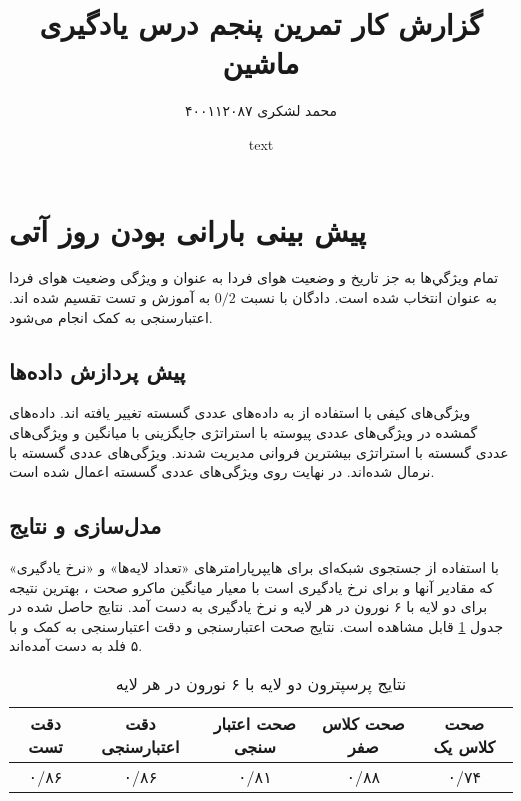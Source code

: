 \documentclass{article}
\title{گزارش کار تمرین پنجم درس یادگیری ماشین}
\author{محمد لشکری ۴۰۰۱۱۲۰۸۷}
\date{text}
\begin{document}
	\maketitle
	
	\section{پیش بینی بارانی بودن روز آتی}
	تمام ویژگي‌ها به جز تاریخ و وضعیت هوای فردا به عنوان 
	و ویژگی وضعیت هوای فردا به عنوان 
	انتخاب شده است. دادگان با نسبت $ 0/2 $ به آموزش و تست تقسیم شده اند. اعتبارسنجی به کمک 
	انجام می‌شود.
	\subsection{پیش پردازش داده‌ها}
	ویژگی‌های کیفی با استفاده از 
	به داده‌های عددی گسسته تغییر یافته اند. داده‌های گمشده در ویژگی‌های عددی پیوسته با استراتژی جایگزینی با میانگین و ویژگی‌های عددی گسسته با استراتژی بیشترین فروانی مدیریت شدند. ویژگی‌های عددی گسسته با 
	نرمال شده‌اند. در نهایت 
	روی ویژگی‌های عددی گسسته اعمال شده است.
	\subsection{مدل‌سازی و نتایج}
	با استفاده از جستجوی شبکه‌ای
	 برای هايپرپارامتر‌های «تعداد لایه‌ها» و «نرخ یادگیری» که مقادیر آنها 
	و برای نرخ یادگیری 
	 است با معیار میانگین ماکرو صحت
	،
	بهترین نتیجه برای دو لایه با ۶ نورون در هر لایه و نرخ یادگیری 
	به دست آمد. نتایج حاصل شده در جدول 
	\ref{perceptron}
	قابل مشاهده است. نتایج صحت اعتبارسنجی و دقت اعتبارسنجی به کمک 
	و با ۵ فلد به دست آمده‌اند.
	\begin{table}[h]
		\parbox{\linewidth}{
		\begin{center}
		\begin{tabular}{|c|c|c|c|c|}
			\hline
			دقت تست & دقت اعتبارسنجی & صحت اعتبار سنجی & صحت کلاس صفر & صحت کلاس یک \\
			\hline
			۰/۸۶& ۰/۸۶ & ۰/۸۱ & ۰/۸۸ & ۰/۷۴\\
			\hline
		\end{tabular}
		\caption{نتایج پرسپترون دو لایه با ۶ نورون در هر لایه}	
		\label{perceptron}
		\end{center}
	}
	\end{table}
\end{document}
